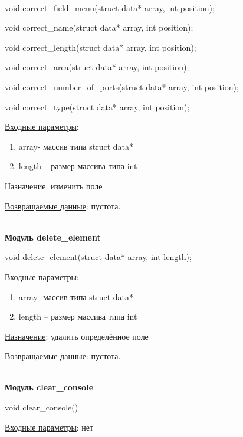 \hspace{0pt}\\



void correct\_field\_menu(struct data* array, int position);

void correct\_name(struct data* array, int position);

void correct\_length(struct data* array, int position);

void correct\_area(struct data* array, int position);

void correct\_number\_of\_ports(struct data* array, int position);

void correct\_type(struct data* array, int position);

\underline{Входные параметры}: 

\begin{enumerate}
    \item array- массив типа struct data*
    \item length – размер массива типа int
\end{enumerate}

\underline{Назначение}: изменить поле 

\underline{Возвращаемые данные}: пустота.

\hspace{0pt}\\



\textbf{Модуль delete\_element}

void delete\_element(struct data* array, int length);

\underline{Входные параметры}: 

\begin{enumerate}
    \item array- массив типа struct data*
    \item length – размер массива типа int
\end{enumerate}

\underline{Назначение}: удалить определённое поле 

\underline{Возвращаемые данные}: пустота.

\hspace{0pt}\\



\textbf{Модуль clear\_console}

void clear\_console()

\underline{Входные параметры}: нет

